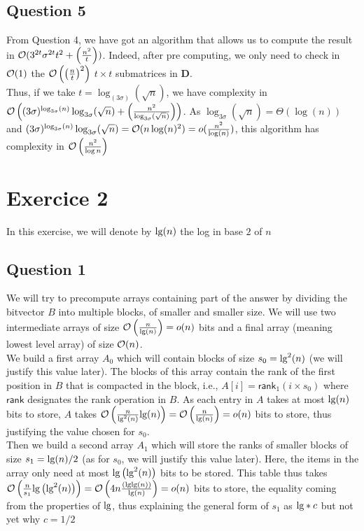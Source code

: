 \documentclass{cours}
\begin{document}
\subsection{Question 5}
From Question 4, we have got an algorithm that allows us to compute the result in $\mathcal{O}{(3^{2t}\sigma^{2t}t^{2} + \left(\frac{n^{2}}{t}\right))}$. Indeed, after pre computing, we only need to check in $\mathcal{O}(1)$ the $\mathcal{O}\left(\left(\frac{n}{t}\right)^{2}\right)$ $t\times t$ submatrices in $\mathbf{D}$.\\
Thus, if we take $t = \log_{(3\sigma)}(\sqrt{n})$, we have complexity in $\mathcal{O}\left((3\sigma)^{\log_{3\sigma}(n)}\log_{3\sigma}(\sqrt{n}) + \left(\frac{n^{2}}{\log_{3\sigma}(\sqrt{n})}\right)\right)$. As $\log_{3\sigma}(\sqrt{n}) = \Theta(\log(n))$ and $(3\sigma)^{\log_{3\sigma}(n)}\log_{3\sigma}(\sqrt{n}) = \mathcal{O}(n \log(n)^{2}) = o(\frac{n^{2}}{\log(n)})$, this algorithm has complexity in $\mathcal{O}\left(\frac{n^{2}}{\log{n}}\right)$

\newpage
\section{Exercice 2}
In this exercise, we will denote by $\textmd{lg}(n)$ the log in base $2$ of $n$
\subsection{Question 1}
We will try to precompute arrays containing part of the answer by dividing the bitvector $B$ into multiple blocks, of smaller and smaller size. We will use two intermediate arrays of size $\mathcal{O}\left(\frac{n}{\textmd{lg}(n)}\right) = o(n)$ bits and a final array (meaning lowest level array) of size $\mathcal{O}(n)$.\\

We build a first array $A_{0}$ which will contain blocks of size $s_{0} = \textmd{lg}^{2}(n)$ (we will justify this value later). The blocks of this array contain the rank of the first position in $B$ that is compacted in the block, i.e., $A[i] = \textsf{rank}_{1}(i \times s_{0})$ where $\textsf{rank}$ designates the rank operation in $B$. As each entry in $A$ takes at most $\textmd{lg}(n)$ bits to store, $A$ takes $\mathcal{O}\left(\frac{n}{\textmd{lg}^{2}(n)}\textmd{lg}(n)\right) = \mathcal{O}\left(\frac{n}{\textmd{lg}(n)}\right) = o(n)$ bits to store, thus justifying the value chosen for $s_{0}$.\\

Then we build a second array $A_{1}$ which will store the ranks of smaller blocks of size $s_{1} = \textmd{lg}(n)/2$ (as for $s_{0}$, we will justify this value later). Here, the items in the array only need at most $\textmd{lg}\left(\textmd{lg}^{2}(n)\right)$ bits to be stored. This table thus takes $\mathcal{O}\left(\frac{n}{s_{1}}\textmd{lg}\left(\textmd{lg}^{2}(n)\right)\right) = \mathcal{O}\left(4n\frac{\left(\textmd{lg}\textmd{lg}(n)\right)}{\textmd{lg}(n)}\right) = o(n)$ bits to store, the equality coming from the properties of $\textmd{lg}$, thus explaining the general form of $s_{1}$ as $\textmd{lg} * c$ but not yet why $c = 1/2$\\
\end{document}
